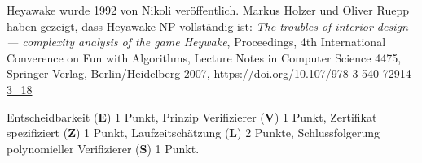 \begin{diskussion}
Heyawake wurde 1992 von Nikoli veröffentlich.
Markus Holzer und Oliver Ruepp haben gezeigt, dass Heyawake
NP-vollständig ist: {\em The troubles of interior design --- complexity
analysis of the game Heywake},
Proceedings, 4th International Converence on Fun with Algorithms,
Lecture Notes in Computer Science 4475, Springer-Verlag, Berlin/Heidelberg
2007,
\url{https://doi.org/10.107/978-3-540-72914-3_18}
\end{diskussion}

\begin{bewertung}
Entscheidbarkeit ({\bf E}) 1 Punkt,
Prinzip Verifizierer ({\bf V}) 1 Punkt,
Zertifikat spezifiziert ({\bf Z}) 1 Punkt,
Laufzeitschätzung ({\bf L}) 2 Punkte,
Schlussfolgerung polynomieller Verifizierer ({\bf S}) 1 Punkt.
\end{bewertung}


